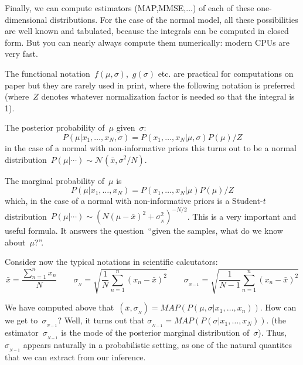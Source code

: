 Finally, we can compute estimators (MAP,MMSE,$\ldots$) of each of these
one-dimensional distributions.
For the case of the normal model, all these possibilities are well known
and tabulated, because the integrals can be computed in closed form.  But you
can nearly always compute them numerically: modern CPUs are very fast.

The functional notation~$f(\mu,\sigma)$,~$g(\sigma)$ etc. are practical for
computations on paper but they are rarely used in print, where the following
notation is preferred (where~$Z$ denotes whatever normalization factor is
needed so that the integral is 1).

The posterior probability of~$\mu$ given~$\sigma$:
$$
P(\mu|x_1,\ldots,x_N,\sigma)=P(x_1,\ldots,x_N|\mu,\sigma)P(\mu)/Z
$$
in the case of a normal with non-informative priors this turns out to be a
normal
distribution~$P(\mu|\cdots)\sim\mathcal{N}\left(\bar{x},\sigma^2/N\right)$.

The marginal probability of~$\mu$ is
$$
P(\mu|x_1,\ldots,x_N)=P(x_1,\ldots,x_N|\mu)P(\mu)/Z
$$
which, in the case of a normal with non-informative priors is a Student-$t$
distribution~$P(\mu|\cdots)\sim\left(N(\mu-\bar
x)^2+\sigma_{{}_N}^2\right)^{-N/2}$.
This is a very important and useful formula.  It answers the question~``given
the samples, what do we know about~$\mu$?''.

Consider now the typical notations in scientific calcutators:
$$
\bar x=\frac{\sum_{n=1}^nx_n}{N}
\qquad
\sigma_{{}_N}=\sqrt{\frac{1}{N}\sum_{n=1}^n(x_n-\bar x)^2}
\qquad
\sigma_{{}_{N-1}}=\sqrt{\frac{1}{N-1}\sum_{n=1}^n(x_n-\bar x)^2}
$$

We have computed above that~$(\bar
x,\sigma_{{}_N})=MAP(P(\mu,\sigma|x_1,\ldots,x_n))$.
How can we get to~$\sigma_{{}_{N-1}}$?  Well, it turns out that
$
\sigma_{{}_{N-1}}=MAP(P(\sigma|x_1,\ldots,x_N)).
$
(the estimator~$\sigma_{{}_{N-1}}$ is the mode of the posterior marginal
distribution of~$\sigma$).  Thus, $\sigma_{{}_{N-1}}$ appears naturally in a
probabilistic setting, as one of the natural quantites that we can extract
from our inference.

